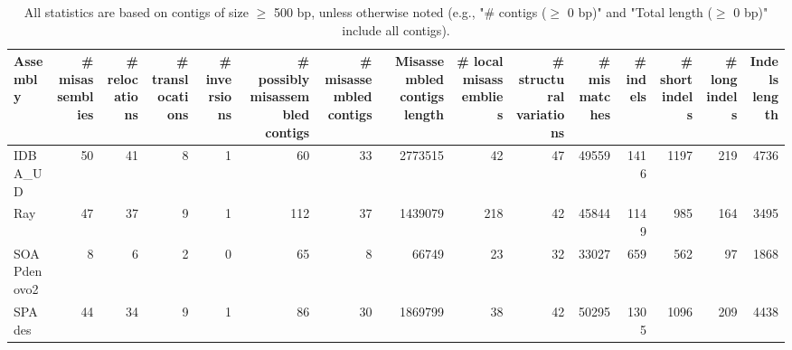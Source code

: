 \documentclass[12pt,a4paper]{article}
\begin{document}
\begin{table}[ht]
\begin{center}
\caption{All statistics are based on contigs of size $\geq$ 500 bp, unless otherwise noted (e.g., "\# contigs ($\geq$ 0 bp)" and "Total length ($\geq$ 0 bp)" include all contigs).}
\begin{tabular}{|l*{14}{|r}|}
\hline
Assembly & \# misassemblies &     \# relocations &     \# translocations &     \# inversions & \# possibly misassembled contigs & \# misassembled contigs & Misassembled contigs length & \# local misassemblies & \# structural variations & \# mismatches & \# indels &     \# short indels &     \# long indels & Indels length \\ \hline
IDBA\_UD & 50 & 41 & 8 & 1 & 60 & 33 & 2773515 & 42 & 47 & 49559 & 1416 & 1197 & 219 & 4736 \\ \hline
Ray & 47 & 37 & 9 & 1 & 112 & 37 & 1439079 & 218 & 42 & 45844 & 1149 & 985 & 164 & 3495 \\ \hline
SOAPdenovo2 & 8 & 6 & 2 & 0 & 65 & 8 & 66749 & 23 & 32 & 33027 & 659 & 562 & 97 & 1868 \\ \hline
SPAdes & 44 & 34 & 9 & 1 & 86 & 30 & 1869799 & 38 & 42 & 50295 & 1305 & 1096 & 209 & 4438 \\ \hline
\end{tabular}
\end{center}
\end{table}
\end{document}
